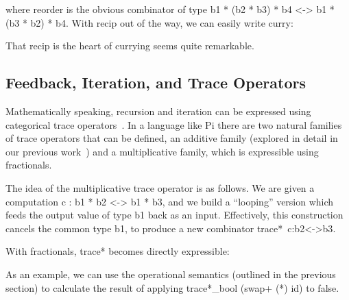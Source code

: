 \documentclass[preprint]{sigplanconf}
\begin{document}

\noindent
where {{reorder}} is the obvious combinator of type {{b1 * (b2 * b3) * b4 <-> b1 * (b3 * b2) * b4}}.
With {{recip}} out of the way, we can easily write {{curry}}:


\noindent That {{recip}} is the heart of currying seems quite remarkable.

\subsection{Feedback, Iteration, and Trace Operators}

Mathematically speaking, recursion and iteration can be expressed using
categorical trace
operators~\cite{joyal1996traced,Hasegawa:1997:RCS:645893.671607}.  In a
language like {{Pi}} there are two natural families of trace operators that
can be defined, an additive family (explored in detail in our previous
work~\cite{rc2011}) and a multiplicative family, which is expressible using
fractionals. 

The idea of the multiplicative trace operator is as follows. We are given a
computation {{c : b1 * b2 <-> b1 * b3}}, and we build a ``looping'' version
which feeds the output value of type {{b1}} back as an input. Effectively,
this construction cancels the common type {{b1}}, to produce a new combinator
{{trace*~c:b2<->b3}}. 

With fractionals, {{trace*}} becomes directly expressible:


As an example, we can use the operational semantics (outlined in the previous
section) to calculate the result of applying {{trace*_{bool} (swap+ (*) id)}}
to {{false}}.
\end{document}
